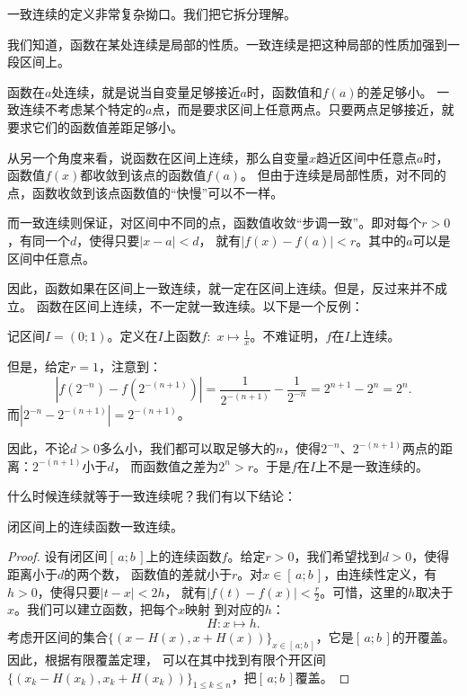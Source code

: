 \documentclass[12pt,UTF8]{ctexbook}
\begin{document}
\begin{appendix}
一致连续的定义非常复杂拗口。我们把它拆分理解。

我们知道，函数在某处连续是局部的性质。一致连续是把这种局部的性质加强到一段区间上。

函数在$a$处连续，就是说当自变量足够接近$a$时，函数值和$f(a)$的差足够小。
一致连续不考虑某个特定的$a$点，而是要求区间上任意两点。只要两点足够接近，就要求它们的函数值差距足够小。

从另一个角度来看，说函数在区间上连续，那么自变量$x$趋近区间中任意点$a$时，函数值$f(x)$都收敛到该点的函数值$f(a)$。
但由于连续是局部性质，对不同的点，函数收敛到该点函数值的“快慢”可以不一样。

而一致连续则保证，对区间中不同的点，函数值收敛“步调一致”。即对每个$r>0$，有同一个$d$，使得只要$|x - a| < d$，
就有$|f(x) - f(a)| < r$。其中的$a$可以是区间中任意点。

因此，函数如果在区间上一致连续，就一定在区间上连续。但是，反过来并不成立。
函数在区间上连续，不一定就一致连续。以下是一个反例：

\begin{ex}
    记区间$I = (0; 1)$。定义在$I$上函数$f: \,\,x \mapsto \frac{1}{x}$。不难证明，$f$在$I$上连续。

    但是，给定$r = 1$，注意到：
    $$ \left|f\left(2^{-n}\right) - f\left(2^{-(n+1)}\right)\right| = \frac{1}{2^{-(n+1)}} - \frac{1}{2^{-n}} = 2^{n+1} - 2^{n} = 2^n. $$
    而$\left|2^{-n} - 2^{-(n+1)}\right| = 2^{-(n+1)}$。

    因此，不论$d>0$多么小，我们都可以取足够大的$n$，使得$2^{-n}$、$2^{-(n+1)}$两点的距离：$2^{-(n+1)}$小于$d$，
    而函数值之差为$2^n > r$。于是$f$在$I$上不是一致连续的。
\end{ex}

什么时候连续就等于一致连续呢？我们有以下结论：

\begin{tm}
    闭区间上的连续函数一致连续。
\end{tm}
\begin{proof}
    设有闭区间$[\,a;b\,]$上的连续函数$f$。给定$r>0$，我们希望找到$d>0$，使得距离小于$d$的两个数，
    函数值的差就小于$r$。对$x\in[\,a; b\,]$，由连续性定义，有$h>0$，使得只要$|t - x| < 2h$，
    就有$|f(t) - f(x)| < \frac{r}{2}$。可惜，这里的$h$取决于$x$。我们可以建立函数，把每个$x$映射
    到对应的$h$：
    $$ H: x \mapsto h. $$
    考虑开区间的集合$\{(x - H(x), x + H(x))\}_{x\in[\,a; b\,]}$，它是$[\,a; b\,]$的开覆盖。因此，根据有限覆盖定理，
    可以在其中找到有限个开区间$\{(x_k - H(x_k), x_k + H(x_k))\}_{1\leqslant k\leqslant n}$，把$[\,a; b\,]$覆盖。
    

\end{proof}
\end{appendix}
\end{document}
